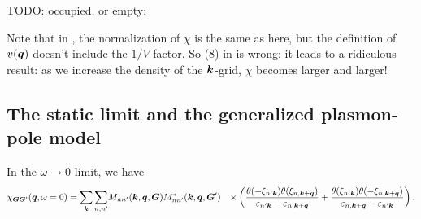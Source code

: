 \documentclass[hyperref, a4paper]{report}
\def\\{}%
\begin{document}
TODO: occupied, or empty: 

Note that in \cite{berkeleygw},
the normalization of $\chi$ is the same as here,
but the definition of $v(\vb*{q})$ doesn't include the $1/V$ factor.
So (8) in \cite{berkeleygw} is wrong:
it leads to a ridiculous result: 
as we increase the density of the $\vb*{k}$-grid,
$\chi$ becomes larger and larger!

\subsection{The static limit and the generalized plasmon-pole model}\label{sec:gw-bse.epsilon.gpp}

In the $\omega \to 0$ limit, 
we have 
\begin{equation}
    \begin{aligned}
        \chi_{\vb*{G} \vb*{G}'}(\vb*{q}, \omega = 0) = \sum_{\vb*{k}} \sum_{n, n'} 
        &M_{n n'} (\vb*{k}, \vb*{q}, \vb*{G}) M^*_{nn'} (\vb*{k}, \vb*{q}, \vb*{G}') \\
        &\times \left(
            \frac{
                \theta(- \xi_{n' \vb*{k}}) \theta(\xi_{n, \vb*{k} + \vb*{q}})
            }{
                \varepsilon_{n' \vb*{k}} - \varepsilon_{n, \vb*{k} + \vb*{q}} 
            }
            + \frac{
                \theta(\xi_{n' \vb*{k}}) \theta(- \xi_{n, \vb*{k} + \vb*{q}})
            }{
                \varepsilon_{n, \vb*{k} + \vb*{q}} - \varepsilon_{n' \vb*{k}}
            }
        \right).
    \end{aligned}
    \label{eq:static-epsilon}
\end{equation}
\end{document}
